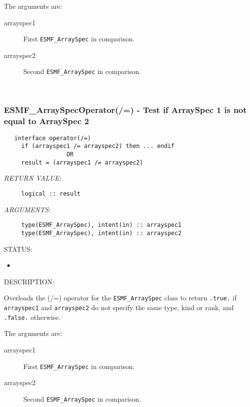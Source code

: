      The arguments are:
     \begin{description}
     \item[arrayspec1]
       First {\tt ESMF\_ArraySpec} in comparison.
     \item[arrayspec2]
       Second {\tt ESMF\_ArraySpec} in comparison.
     \end{description}
   
 
\mbox{}\hrulefill\ 
 
\subsubsection [ESMF\_ArraySpecOperator(/=)] {ESMF\_ArraySpecOperator(/=) - Test if ArraySpec 1 is not equal to ArraySpec 2}


  
\begin{verbatim}   interface operator(/=)
     if (arrayspec1 /= arrayspec2) then ... endif
                  OR
     result = (arrayspec1 /= arrayspec2)\end{verbatim}{\em RETURN VALUE:}
\begin{verbatim}     logical :: result\end{verbatim}{\em ARGUMENTS:}
\begin{verbatim}     type(ESMF_ArraySpec), intent(in) :: arrayspec1
     type(ESMF_ArraySpec), intent(in) :: arrayspec2\end{verbatim}
{\sf STATUS:}
   \begin{itemize}
   \item{}
   \end{itemize}
  
{\sf DESCRIPTION:\\ }


     Overloads the (/=) operator for the {\tt ESMF\_ArraySpec} class to return 
     {\tt .true.} if {\tt arrayspec1} and {\tt arrayspec2} do not specify the
     same type, kind or rank, and {\tt .false.} otherwise.
  
     The arguments are:
     \begin{description}
     \item[arrayspec1]
       First {\tt ESMF\_ArraySpec} in comparison.
     \item[arrayspec2]
       Second {\tt ESMF\_ArraySpec} in comparison.
     \end{description}
    
